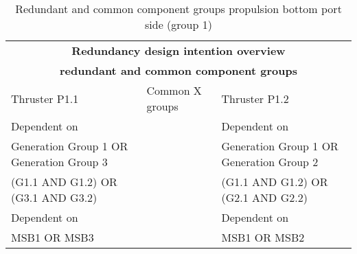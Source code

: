     
\begin{table}[h]
    \centering
    \begin{tabular}{|m{5.6cm}|m{2.5cm}|m{5.6cm}|}
    \hline
    \multicolumn{3}{|c|}{\textbf{Redundancy design intention overview}} \\
    \multicolumn{3}{|c|}{\textbf{redundant and common component groups}} \\
    \hline
    Thruster P1.1 & Common X groups & Thruster P1.2 \\
    \hline
    Dependent on & & Dependent on \\
    \hline
    Generation Group 1 OR Generation Group 3 & & Generation Group 1 OR Generation Group 2 \\
    \hline
    (G1.1 AND G1.2) OR (G3.1 AND G3.2) & & (G1.1 AND G1.2) OR (G2.1 AND G2.2) \\
    \hline
    Dependent on & & Dependent on \\
    \hline
    MSB1 OR MSB3 & & MSB1 OR MSB2 \\
    \hline
    \end{tabular}
    \caption{Redundant and common component groups propulsion bottom port side (group 1)}
    \label{tab:RedundantComponentGroupsThrusters1}
\end{table}

